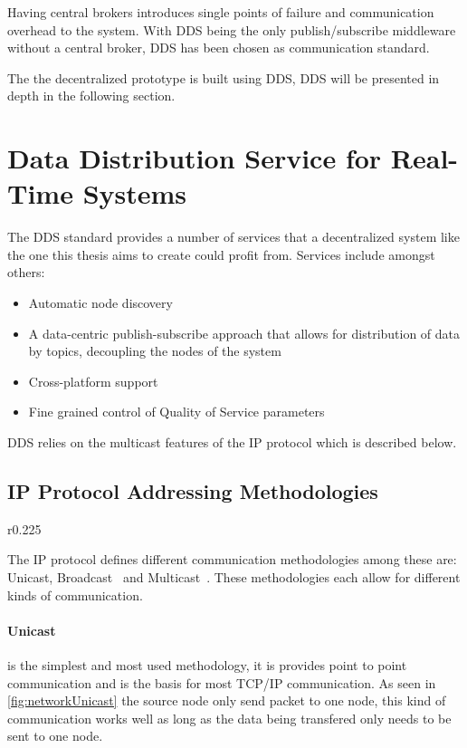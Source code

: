 Having central brokers introduces single points of failure and communication overhead to the system. With DDS being the only publish/subscribe middleware without a central broker, DDS has been chosen as communication standard. 

The the decentralized prototype is built using DDS, DDS will be presented in depth in the following section.

\section{Data Distribution Service for Real-Time Systems}
\label{sec:DDS}
The DDS standard provides a number of services that a decentralized system like the one this thesis aims to create could profit from.
Services include amongst others:

\begin{itemize}
	\item Automatic node discovery
	\item A data-centric publish-subscribe approach that allows for distribution of data by topics, decoupling the nodes of the system
	\item Cross-platform support
	\item Fine grained control of Quality of Service parameters
\end{itemize}

DDS relies on the multicast features of the IP protocol which is described below.

\subsection{IP Protocol Addressing Methodologies}

\begin{wrapfigure}{r}{0.225\textwidth}
	\vspace{-20pt}
	
	\vspace{-10pt}
\end{wrapfigure}

The IP protocol defines different communication methodologies among these are: Unicast, Broadcast~\cite{RFC0919_Broadcast} and Multicast~\cite{RFC1112_Multicast_IGMPv1}.
These methodologies each allow for different kinds of communication.

\paragraph{Unicast} is the simplest and most used methodology, it is provides point to point communication and is the basis for most TCP/IP communication.
As seen in \cref{fig:networkUnicast} the source node only send packet to one node, this kind of communication works well as long as the data being transfered only needs to be sent to one node.


